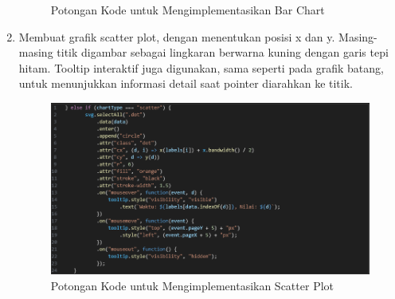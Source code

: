 \begin{enumerate}
\begin{figure}[H]
		\caption{Potongan Kode untuk Mengimplementasikan Bar Chart}
		\label{Potongan Kode untuk Mengimplementasikan Bar Chart}
	\end{figure}
	\item Membuat grafik scatter plot, dengan menentukan posisi x dan y. Masing-masing titik digambar sebagai lingkaran berwarna kuning dengan garis tepi hitam. Tooltip interaktif juga digunakan, sama seperti pada grafik batang, untuk menunjukkan informasi detail saat pointer diarahkan ke titik.
	\begin{figure}[H]
		\centering
		\includegraphics[width=0.8\linewidth]{gambar/Pembahasan/implementasi scatter plot.png}
		\caption{Potongan Kode untuk Mengimplementasikan Scatter Plot}
		\label{Potongan Kode untuk Mengimplementasikan Scatter Plot}
	\end{figure}
	

\end{enumerate}
